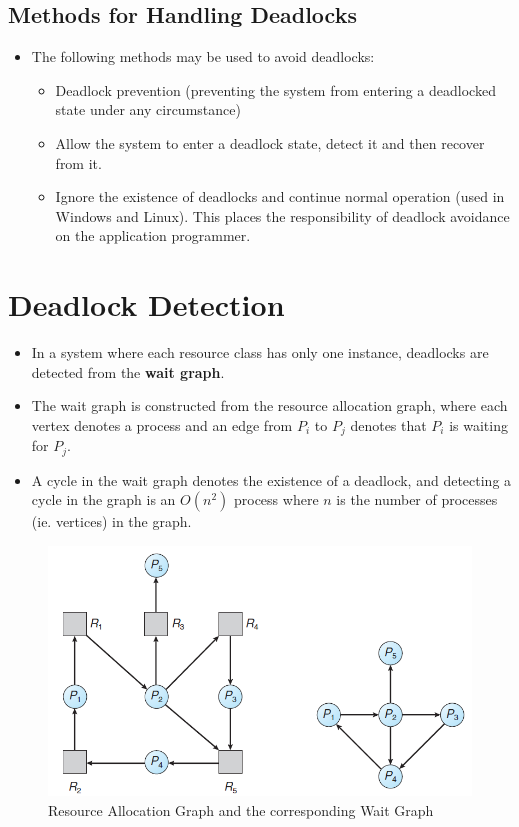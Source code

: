 \documentclass{article}
\theoremstyle{plain}
\theoremstyle{definition}
\begin{document}
\subsection{Methods for Handling Deadlocks}
\begin{itemize}
    \item The following methods may be used to avoid deadlocks:
    \begin{itemize}
        \item Deadlock prevention (preventing the system from entering a deadlocked state under any circumstance)
        
        \item Allow the system to enter a deadlock state, detect it and then recover from it.
        
        \item Ignore the existence of deadlocks and continue normal operation (used in Windows and Linux). This places the responsibility of deadlock avoidance on the application programmer. 
    \end{itemize}
\end{itemize}

\section{Deadlock Detection}
\begin{itemize}
    \item In a system where each resource class has only one instance, deadlocks are detected from the \textbf{wait graph}.
    
    \item The wait graph is constructed from the resource allocation graph, where each vertex denotes a process and an edge from $P_i$ to $P_j$ denotes that $P_i$ is waiting for $P_j$.
    
    \item A cycle in the wait graph denotes the existence of a deadlock, and detecting a cycle in the graph is an $O(n^2)$ process where $n$ is the number of processes (ie. vertices) in the graph. 
    
\end{itemize}
\begin{figure}[h]
    \centering
    \includegraphics[scale = 0.5]{os3.png}
    \caption{Resource Allocation Graph and the corresponding Wait Graph}
    \label{fig:my_label_xxx}
\end{figure}
\end{document}
